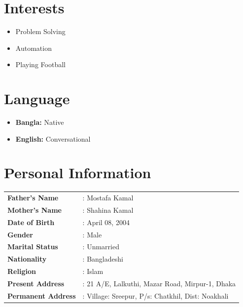 \documentclass[a4paper,10pt]{article}
\begin{document}
\section*{Interests}
\begin{itemize}[noitemsep]
    \item Problem Solving
    \item Automation
    \item Playing Football
\end{itemize}

\section*{Language}
\begin{itemize}[noitemsep]
    \item \textbf{Bangla:} Native
    \item \textbf{English:} Conversational
\end{itemize}

\section*{Personal Information}
\begin{tabular}{ll}
    \textbf{Father's Name} & : Mostafa Kamal \\
    \textbf{Mother's Name} & : Shahina Kamal \\
    \textbf{Date of Birth} & : April 08, 2004 \\
    \textbf{Gender}        & : Male \\
    \textbf{Marital Status} & : Unmarried \\
    \textbf{Nationality}   & : Bangladeshi \\
    \textbf{Religion}      & : Islam \\
    \textbf{Present Address} & : 21 A/E, Lalkuthi, Mazar Road, Mirpur-1, Dhaka \\
    \textbf{Permanent Address} & : Village: Sreepur, P/s: Chatkhil, Dist: Noakhali 
\end{tabular}
\end{document}
